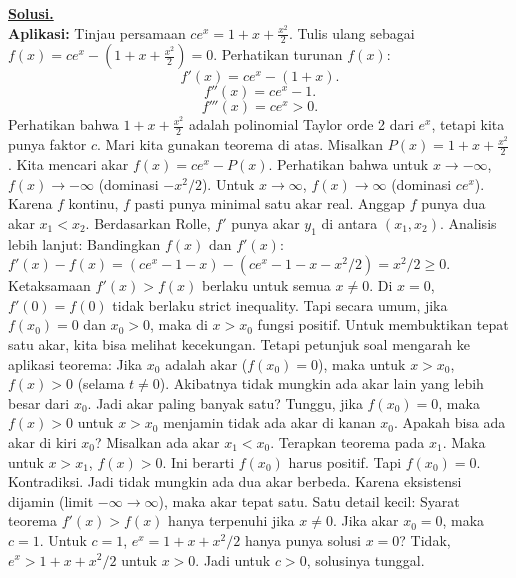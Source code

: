 \documentclass[12pt,twoside]{article}
\newenvironment{solution}
{
	\par\noindent\textbf{\underline{Solusi.}}\\
}
{
	\par
}
\begin{document}
\begin{enumerate}
\begin{solution}
          \textbf{Aplikasi:}
          Tinjau persamaan $ce^x = 1+x+\frac{x^2}{2}$.
          Tulis ulang sebagai $f(x) = ce^x - (1+x+\frac{x^2}{2}) = 0$.
          Perhatikan turunan $f(x)$:
          $$ f'(x) = ce^x - (1+x). $$
          $$ f''(x) = ce^x - 1. $$
          $$ f'''(x) = ce^x > 0. $$
          Perhatikan bahwa $1+x+\frac{x^2}{2}$ adalah polinomial Taylor orde 2 dari $e^x$, tetapi kita punya faktor $c$.
          Mari kita gunakan teorema di atas. Misalkan $P(x) = 1+x+\frac{x^2}{2}$.
          Kita mencari akar $f(x) = ce^x - P(x)$.
          Perhatikan bahwa untuk $x \to -\infty$, $f(x) \to -\infty$ (dominasi $-x^2/2$).
          Untuk $x \to \infty$, $f(x) \to \infty$ (dominasi $ce^x$).
          Karena $f$ kontinu, $f$ pasti punya minimal satu akar real.
          Anggap $f$ punya dua akar $x_1 < x_2$.
          Berdasarkan Rolle, $f'$ punya akar $y_1$ di antara $(x_1, x_2)$.
          Analisis lebih lanjut:
          Bandingkan $f(x)$ dan $f'(x)$:
          $f'(x) - f(x) = (ce^x - 1 - x) - (ce^x - 1 - x - x^2/2) = x^2/2 \ge 0$.
          Ketaksamaan $f'(x) > f(x)$ berlaku untuk semua $x \ne 0$.
          Di $x=0$, $f'(0) = f(0)$ tidak berlaku strict inequality.
          Tapi secara umum, jika $f(x_0)=0$ dan $x_0 > 0$, maka di $x > x_0$ fungsi positif.
          Untuk membuktikan tepat satu akar, kita bisa melihat kecekungan.
          Tetapi petunjuk soal mengarah ke aplikasi teorema:
          Jika $x_0$ adalah akar ($f(x_0)=0$), maka untuk $x>x_0$, $f(x)>0$ (selama $t \ne 0$).
          Akibatnya tidak mungkin ada akar lain yang lebih besar dari $x_0$.
          Jadi akar paling banyak satu?
          Tunggu, jika $f(x_0)=0$, maka $f(x)>0$ untuk $x>x_0$ menjamin tidak ada akar di kanan $x_0$.
          Apakah bisa ada akar di kiri $x_0$?
          Misalkan ada akar $x_1 < x_0$. Terapkan teorema pada $x_1$. Maka untuk $x > x_1$, $f(x) > 0$.
          Ini berarti $f(x_0)$ harus positif. Tapi $f(x_0)=0$. Kontradiksi.
          Jadi tidak mungkin ada dua akar berbeda.
          Karena eksistensi dijamin (limit $-\infty \to \infty$), maka akar tepat satu.
          Satu detail kecil: Syarat teorema $f'(x) > f(x)$ hanya terpenuhi jika $x \ne 0$.
          Jika akar $x_0 = 0$, maka $c = 1$. Untuk $c=1$, $e^x = 1+x+x^2/2$ hanya punya solusi $x=0$? Tidak, $e^x > 1+x+x^2/2$ untuk $x>0$.
          Jadi untuk $c>0$, solusinya tunggal.
        \end{solution}


\end{enumerate}
\end{document}

